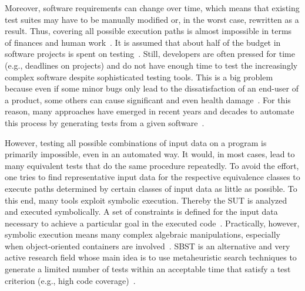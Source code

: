 \documentclass[paper=a4,%
  twoside,%
  BCOR4mm,%
  abstract=true,%
  toc=bibliography,%
  chapterprefix=true,%
  toc=bibliographynumbered,%
  open=right,%
  english,%
  pagesize=pdftex]{scrreprt}
\begin{document}
Moreover, software requirements can change over time, which means that existing test suites may have to be manually modified or, in the worst case, rewritten as a result. Thus, covering all possible execution paths is almost impossible in terms of finances and human work~\cite{Myers2012}. It is assumed that about half of the budget in software projects is spent on testing~\cite{Beizer2003}. Still, developers are often pressed for time (e.g., deadlines on projects) and do not have enough time to test the increasingly complex software despite sophisticated testing tools. This is a big problem because even if some minor bugs only lead to the dissatisfaction of an end-user of a product, some others can cause significant and even health damage~\cite{Myers2012}. For this reason, many approaches have emerged in recent years and decades to automate this process by generating tests from a given software~\cite{McMinn_2004}.

However, testing all possible combinations of input data on a program is primarily impossible, even in an automated way. It would, in most cases, lead to many equivalent tests that do the same procedure repeatedly. To avoid the effort, one tries to find representative input data for the respective equivalence classes to execute paths determined by certain classes of input data as little as possible. To this end, many tools exploit symbolic execution. Thereby the \ac{SUT} is analyzed and executed symbolically. A set of constraints is defined for the input data necessary to achieve a particular goal in the executed code~\cite{Clarke1976}. Practically, however, symbolic execution means many complex algebraic manipulations, especially when object-oriented containers are involved~\cite{Korel1990}. \ac{SBST} is an alternative and very active research field whose main idea is to use metaheuristic search techniques to generate a limited number of tests within an acceptable time that satisfy a test criterion (e.g., high code coverage)~\cite{McMinn_2004}.
\end{document}
